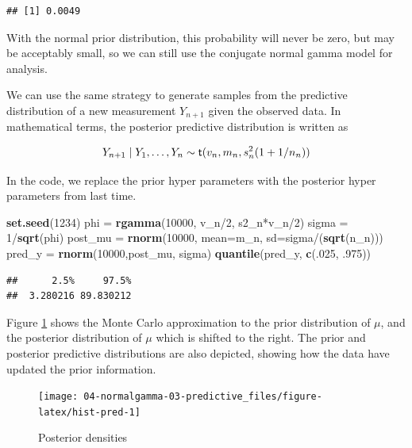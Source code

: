 \documentclass[]{book}
\newenvironment{Shaded}{\begin{snugshade}}{\end{snugshade}}
\newcommand{\KeywordTok}[1]{\textcolor[rgb]{0.13,0.29,0.53}{\textbf{{#1}}}}
\newcommand{\DataTypeTok}[1]{\textcolor[rgb]{0.13,0.29,0.53}{{#1}}}
\newcommand{\DecValTok}[1]{\textcolor[rgb]{0.00,0.00,0.81}{{#1}}}
\newcommand{\StringTok}[1]{\textcolor[rgb]{0.31,0.60,0.02}{{#1}}}
\newcommand{\NormalTok}[1]{{#1}}
\theoremstyle{definition}
\theoremstyle{definition}
\theoremstyle{definition}
\theoremstyle{remark}
\begin{document}
\begin{verbatim}
## [1] 0.0049
\end{verbatim}

With the normal prior distribution, this probability will never be zero,
but may be acceptably small, so we can still use the conjugate normal
gamma model for analysis.

We can use the same strategy to generate samples from the predictive
distribution of a new measurement \(Y_{n+1}\) given the observed data.
In mathematical terms, the posterior predictive distribution is written
as

\[Y_{n+1} \mid Y_1, \ldots, Y_n \sim \textsf{t}(v_n, m_n, s^2_n (1 + 1/n_n))\]

In the code, we replace the prior hyper parameters with the posterior
hyper parameters from last time.

\begin{Shaded}
\begin{Highlighting}[]
\KeywordTok{set.seed}\NormalTok{(}\DecValTok{1234}\NormalTok{)}
\NormalTok{phi =}\StringTok{ }\KeywordTok{rgamma}\NormalTok{(}\DecValTok{10000}\NormalTok{, v_n/}\DecValTok{2}\NormalTok{, s2_n*v_n/}\DecValTok{2}\NormalTok{)}
\NormalTok{sigma =}\StringTok{ }\DecValTok{1}\NormalTok{/}\KeywordTok{sqrt}\NormalTok{(phi)}
\NormalTok{post_mu =}\StringTok{ }\KeywordTok{rnorm}\NormalTok{(}\DecValTok{10000}\NormalTok{, }\DataTypeTok{mean=}\NormalTok{m_n, }\DataTypeTok{sd=}\NormalTok{sigma/(}\KeywordTok{sqrt}\NormalTok{(n_n)))}
\NormalTok{pred_y =}\StringTok{  }\KeywordTok{rnorm}\NormalTok{(}\DecValTok{10000}\NormalTok{,post_mu, sigma)}
\KeywordTok{quantile}\NormalTok{(pred_y, }\KeywordTok{c}\NormalTok{(.}\DecValTok{025}\NormalTok{, .}\DecValTok{975}\NormalTok{))}
\end{Highlighting}
\end{Shaded}

\begin{verbatim}
##      2.5%     97.5% 
##  3.280216 89.830212
\end{verbatim}

Figure \ref{fig:hist-pred} shows the Monte Carlo approximation to the
prior distribution of \(\mu\), and the posterior distribution of \(\mu\)
which is shifted to the right. The prior and posterior predictive
distributions are also depicted, showing how the data have updated the
prior information.

\begin{figure}

{\centering \texttt{[image: 04-normalgamma-03-predictive\_files/figure-latex/hist-pred-1]} 

}

\caption{Posterior densities}\label{fig:hist-pred}
\end{figure}
\end{document}
